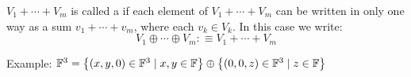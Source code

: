 \setcounter{thm}{40}
\begin{mydef}
  \label{def: direct sum}
  $V_1 + \cdots + V_m$ is called a  if each element of $V_1 +\cdots+V_m$ can be written in only one way as a sum $v_1 + \cdots + v_m$, where each $v_k \in V_k$. In this case we write:
  \begin{equation}
    V_1 \oplus \cdots \oplus V_m :\equiv V_1 + \cdots + V_m
  \end{equation}
\end{mydef}

\begin{example}
  Example: $\mathbb{F}^3 =
  \left \{ \left ( x, y, 0 \right ) \in \mathbb{F}^3 \mid x,y \in \mathbb{F} \right \}
  \oplus
  \left \{ \left (  0, 0, z  \right ) \in \mathbb{F}^3 \mid z \in \mathbb{F} \right \}$
\end{example}


